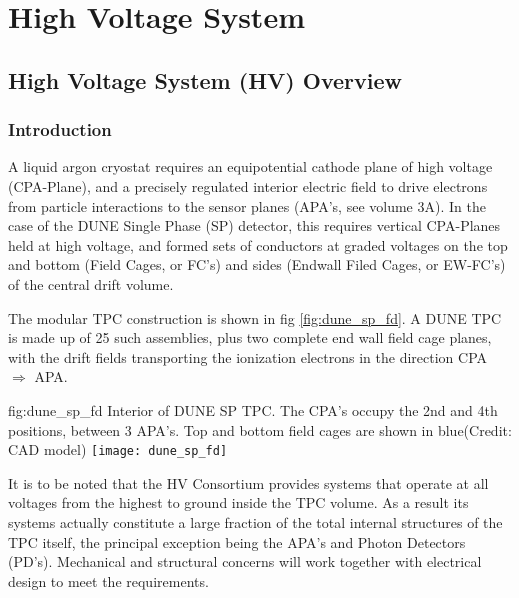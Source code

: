 \chapter{High Voltage System}
\label{ch:fdsp-hv}

\section{High Voltage System (HV) Overview}
\label{sec:fdsp-hv-ov}


\subsection{Introduction}
\label{sec:fdsp-hv-intro}
A liquid argon cryostat requires an equipotential cathode plane of high voltage (CPA-Plane), and a precisely regulated interior electric field to drive electrons from particle interactions to the sensor planes (APA's, see volume 3A). In the case of the DUNE Single Phase (SP) detector, this requires vertical CPA-Planes held at high voltage, and formed sets of conductors at graded voltages on the top and bottom (Field Cages, or FC's) and sides (Endwall Filed Cages, or EW-FC's) of the central drift volume.

The modular TPC construction is shown in fig \ref{fig:dune_sp_fd}. A DUNE TPC is made up of 25 such assemblies, plus two complete end wall field cage planes, with the  drift fields transporting the ionization electrons in the direction CPA $\Rightarrow$ APA. 

\begin{dunefigure}{fig:dune_sp_fd}
{Interior of DUNE SP TPC. The CPA's occupy the 2nd and 4th positions, between 3 APA's. Top and bottom field cages are shown in blue(Credit: CAD model)}
\texttt{[image: dune\_sp\_fd]}
\end{dunefigure}

It is to be noted that the HV Consortium provides systems that operate at all voltages from the highest to ground inside the TPC volume. As a result its systems actually constitute a large fraction of the total internal structures of the TPC itself, the principal exception being the APA's and Photon Detectors (PD's). Mechanical and structural concerns will work together with electrical design to meet the requirements.

